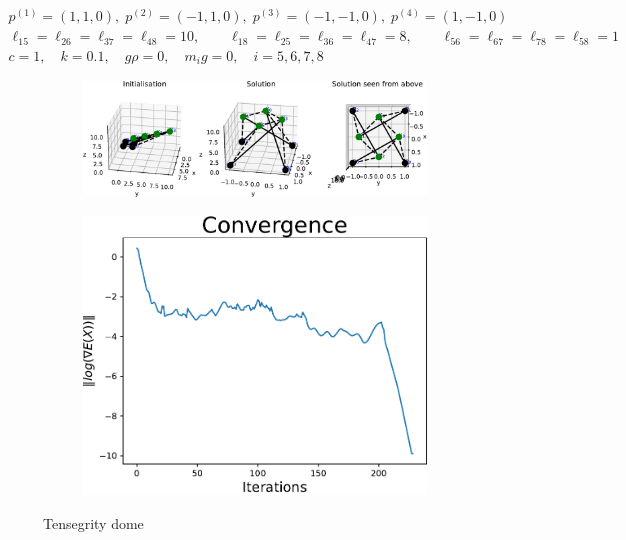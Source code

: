 \begin{equation*}
    \begin{gathered}
    p^{(1)} = (1,1,0),\; p^{(2)} = (-1,1,0),\; p^{(3)} = (-1,-1,0),\; p^{(4)} = (1,-1,0)\\
    \ell_{15} = \ell_{26} = \ell_{37} = \ell_{48} = 10, \qquad \ell_{18} = \ell_{25} = \ell_{36} = \ell_{47} = 8, \qquad \ell_{56} = \ell_{67} = \ell_{78} = \ell_{58} = 1\\
    c=1, \quad k= 0.1, \quad g \rho = 0,\quad m_i g = 0, \quad i = 5,6,7,8
    \end{gathered}
\end{equation*}


\begin{figure}[!ht]
\centering
\begin{subfigure}{.72\textwidth}
  \centering
  \includegraphics[width=0.99\linewidth]{Bilder/P69.pdf}
\end{subfigure}%
\begin{subfigure}{.3\textwidth}
  \centering
  \includegraphics[width=0.99\linewidth]{Bilder/P69conv.pdf}
  \label{fig:sub2}
\end{subfigure}
\caption{Tensegrity dome}
\label{P69}
\end{figure}





